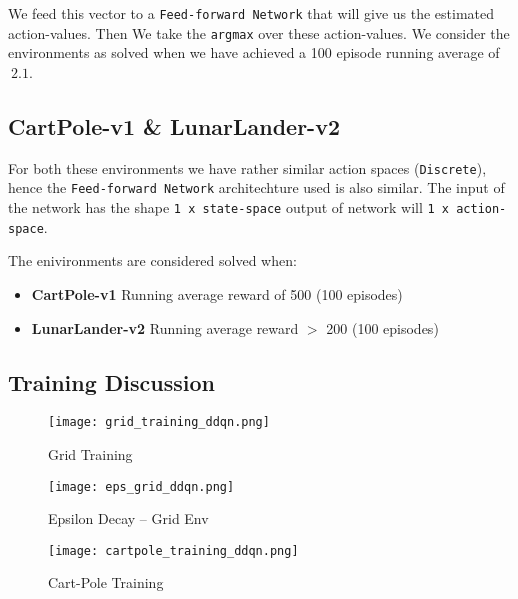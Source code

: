 \documentclass{article} %
\begin{document}
We feed this vector to a \verb|Feed-forward Network| that will give us the estimated
action-values. Then We take the \verb|argmax| over these action-values. We consider the
environments as solved when we have achieved a 100 episode running average of $~2.1$.

\subsection{CartPole-v1 \& LunarLander-v2}
For both these environments we have rather similar action spaces (\verb|Discrete|), hence the
\verb|Feed-forward Network| architechture used is also similar. The input of the network has the shape
\verb|1 x state-space| output of network will \verb|1 x action-space|.

The enivironments are considered solved when:
\begin{itemize}
    \item[] \textbf{CartPole-v1} Running average reward of 500 (100 episodes)
    \item[] \textbf{LunarLander-v2} Running average reward $>$ 200 (100 episodes)
\end{itemize}



\subsection{Training Discussion}

\begin{figure}[H]
    \begin{center}
        \texttt{[image: grid\_training\_ddqn.png]}
    \end{center}
    \caption{Grid Training}
\end{figure}

\begin{figure}[H]
    \begin{center}
        \texttt{[image: eps\_grid\_ddqn.png]}
    \end{center}
    \caption{Epsilon Decay -- Grid Env}
\end{figure}

\begin{figure}[H]
    \begin{center}
        \texttt{[image: cartpole\_training\_ddqn.png]}
    \end{center}
    \caption{Cart-Pole Training}
\end{figure}
\end{document}
